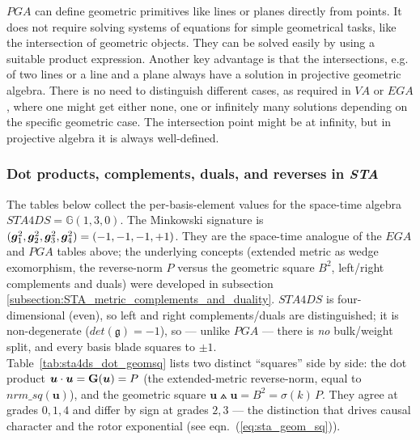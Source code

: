 $PGA$ can define geometric primitives like lines or planes directly from points. It does
not require solving systems of equations for simple geometrical tasks, like the
intersection of geometric objects. They can be solved easily by using a suitable product
expression. Another key advantage is that the intersections, e.g. of two lines or a line
and a plane always have a solution in projective geometric algebra. There is no need to
distinguish different cases, as required in $V\!A$ or $EGA$, where one might get either
none, one or infinitely many solutions depending on the specific geometric case. The
intersection point might be at infinity, but in projective algebra it is always
well-defined.

\newpage

\subsubsection{Dot products, complements, duals, and reverses in \textit{STA}}
\label{subsection:tables_of_products_sta}

The tables below collect the per-basis-element values for the space-time algebra
$STA4DS = \mathbb{G}(1,3,0)$. The Minkowski signature is $(\bm{g}_{1}^2, \bm{g}_{2}^2, \bm{g}_{3}^2, \bm{g}_{4}^2) = (-1,-1,-1,+1)$.
They are the space-time analogue of the $EGA$ and $PGA$ tables above; the underlying
concepts (extended metric as wedge exomorphism, the reverse-norm $P$ versus the geometric
square $B^2$, left/right complements and duals) were developed in subsection
\ref{subsection:STA_metric_complements_and_duality}. $STA4DS$ is four-dimensional (even),
so left and right complements/duals are distinguished; it is non-degenerate
($det(\mathfrak{g}) = -1$), so --- unlike $PGA$ --- there is \emph{no} bulk/weight split, and
every basis blade squares to $\pm 1$. \\

Table~\ref{tab:sta4ds_dot_geomsq} lists two distinct ``squares'' side by side: the dot
product $\bm{u}\cdot\bm{u} = \mathbf{G}(\bm{u}) = P$ (the extended-metric reverse-norm,
equal to $nrm\_sq(\bm{u})$), and the geometric square $\bm{u}\wedgedot\bm{u} = B^2 =
\sigma(k)\,P$. They agree at grades $0, 1, 4$ and differ by sign at grades $2, 3$ --- the
distinction that drives causal character and the rotor exponential (see
eqn.~(\ref{eq:sta_geom_sq})). \\

\begingroup
\setlength{\abovecaptionskip}{2pt}
\setlength{\belowcaptionskip}{2pt}
\renewcommand{\arraystretch}{0.95}

